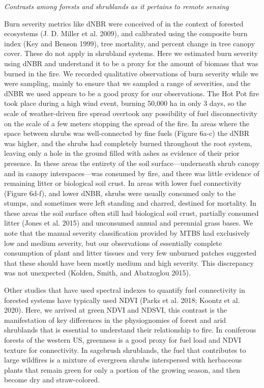 \documentclass[
  12pt,
]{article}
\begin{document}
\emph{Contrasts among forests and shrublands as it pertains to remote
sensing}

Burn severity metrics like dNBR were conceived of in the context of
forested ecosystems (J. D. Miller et al. 2009), and calibrated using the
composite burn index (Key and Benson 1999), tree mortality, and percent
change in tree canopy cover. These do not apply in shrubland systems.
Here we estimated burn severity using dNBR and understand it to be a
proxy for the amount of biomass that was burned in the fire. We recorded
qualitative observations of burn severity while we were sampling, mainly
to ensure that we sampled a range of severities, and the dNBR we used
appears to be a good proxy for our observations. The Hot Pot fire took
place during a high wind event, burning 50,000 ha in only 3 days, so the
scale of weather-driven fire spread overtook any possibility of fuel
disconnectivity on the scale of a few meters stopping the spread of the
fire. In areas where the space between shrubs was well-connected by fine
fuels (Figure 6a-c) the dNBR was higher, and the shrubs had completely
burned throughout the root system, leaving only a hole in the ground
filled with ashes as evidence of their prior presence. In these areas
the entirety of the soil surface---underneath shrub canopy and in canopy
interspaces---was consumed by fire, and there was little evidence of
remaining litter or biological soil crust. In areas with lower fuel
connectivity (Figure 6d-f), and lower dNBR, shrubs were usually consumed
only to the stumps, and sometimes were left standing and charred,
destined for mortality. In these areas the soil surface often still had
biological soil crust, partially consumed litter (Jones et al. 2015) and
unconsumed annual and perennial grass bases. We note that the manual
severity classification provided by MTBS had exclusively low and medium
severity, but our observations of essentially complete consumption of
plant and litter tissues and very few unburned patches suggested that
these should have been mostly medium and high severity. This discrepancy
was not unexpected (Kolden, Smith, and Abatzoglou 2015).

Other studies that have used spectral indexes to quantify fuel
connectivity in forested systems have typically used NDVI (Parks et al.
2018; Koontz et al. 2020). Here, we arrived at green NDVI and NDSVI,
this contrast is the manifestation of key differences in the
physiognomies of forest and arid shrublands that is essential to
understand their relationship to fire. In coniferous forests of the
western US, greenness is a good proxy for fuel load and NDVI texture for
connectivity. In sagebrush shrublands, the fuel that contributes to
large wildfires is a mixture of evergreen shrubs interspersed with
herbaceous plants that remain green for only a portion of the growing
season, and then become dry and straw-colored.
\end{document}
